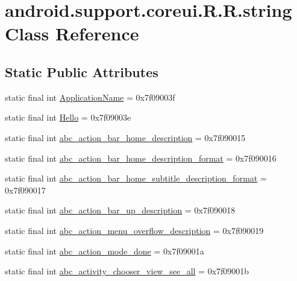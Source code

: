 \hypertarget{classandroid_1_1support_1_1coreui_1_1_r_1_1string}{
\section{android.support.coreui.R.R.string Class Reference}
\label{classandroid_1_1support_1_1coreui_1_1_r_1_1string}
}
\subsection*{Static Public Attributes}
\begin{CompactItemize}
\item 
static final int \hyperlink{classandroid_1_1support_1_1coreui_1_1_r_1_1string_73b765b0808e9c5b620092d817f20ee8}{ApplicationName} = 0x7f09003f
\item 
static final int \hyperlink{classandroid_1_1support_1_1coreui_1_1_r_1_1string_b077e258a15fa410a4b5e510c6bb945e}{Hello} = 0x7f09003e
\item 
static final int \hyperlink{classandroid_1_1support_1_1coreui_1_1_r_1_1string_d4883f3de51e555ff3eef43f4bca8899}{abc\_\-action\_\-bar\_\-home\_\-description} = 0x7f090015
\item 
static final int \hyperlink{classandroid_1_1support_1_1coreui_1_1_r_1_1string_fbfbf032c3f3baf9e1af6f9ca1759944}{abc\_\-action\_\-bar\_\-home\_\-description\_\-format} = 0x7f090016
\item 
static final int \hyperlink{classandroid_1_1support_1_1coreui_1_1_r_1_1string_3cff4ac30391407ab4b2c1f3571750c5}{abc\_\-action\_\-bar\_\-home\_\-subtitle\_\-description\_\-format} = 0x7f090017
\item 
static final int \hyperlink{classandroid_1_1support_1_1coreui_1_1_r_1_1string_f03f1ee7a54ee38bf9f22864d733ce37}{abc\_\-action\_\-bar\_\-up\_\-description} = 0x7f090018
\item 
static final int \hyperlink{classandroid_1_1support_1_1coreui_1_1_r_1_1string_1164c56c1a4d727d1b0b294cecae5343}{abc\_\-action\_\-menu\_\-overflow\_\-description} = 0x7f090019
\item 
static final int \hyperlink{classandroid_1_1support_1_1coreui_1_1_r_1_1string_638adc499990a0bdc2f7f9b21ce923c9}{abc\_\-action\_\-mode\_\-done} = 0x7f09001a
\item 
static final int \hyperlink{classandroid_1_1support_1_1coreui_1_1_r_1_1string_a1d4ddfae5fdbbed09950a7b8953a01f}{abc\_\-activity\_\-chooser\_\-view\_\-see\_\-all} = 0x7f09001b

\end{CompactItemize}
